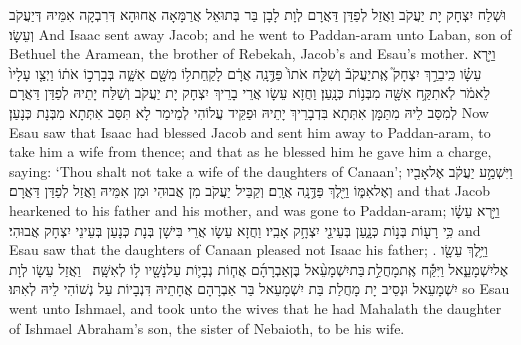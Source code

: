 {וּשְׁלַח יִצְחָק יָת יַעֲקֹב וַאֲזַל לְפַדַּן דַּאֲרָם לְוָת לָבָן בַּר בְּתוּאֵל אֲרַמָּאָה אֲחוּהָא דְּרִבְקָה אִמֵּיהּ דְּיַעֲקֹב וְעֵשָׂו׃}
{And Isaac sent away Jacob; and he went to Paddan-aram unto Laban, son of Bethuel the Aramean, the brother of Rebekah, Jacob’s and Esau’s mother.}{}
{וַיַּ֣רְא עֵשָׂ֗ו כִּֽי\maqqaf בֵרַ֣ךְ יִצְחָק֮ אֶֽת\maqqaf יַעֲקֹב֒ וְשִׁלַּ֤ח אֹתוֹ֙ פַּדֶּ֣נָֽה אֲרָ֔ם לָקַֽחַת\maqqaf ל֥וֹ מִשָּׁ֖ם אִשָּׁ֑ה בְּבָרְכ֣וֹ אֹת֔וֹ וַיְצַ֤ו עָלָיו֙ לֵאמֹ֔ר לֹֽא\maqqaf תִקַּ֥ח אִשָּׁ֖ה מִבְּנ֥וֹת כְּנָֽעַן׃}
{וַחֲזָא עֵשָׂו אֲרֵי בָרֵיךְ יִצְחָק יָת יַעֲקֹב וְשַׁלַּח יָתֵיהּ לְפַדַּן דַּאֲרָם לְמִסַּב לֵיהּ מִתַּמָּן אִתְּתָא בִּדְבָרֵיךְ יָתֵיהּ וּפַקֵּיד עֲלוֹהִי לְמֵימַר לָא תִּסַּב אִתְּתָא מִבְּנָת כְּנָעַן׃}
{Now Esau saw that Isaac had blessed Jacob and sent him away to Paddan-aram, to take him a wife from thence; and that as he blessed him he gave him a charge, saying: ‘Thou shalt not take a wife of the daughters of Canaan’;}{}
{וַיִּשְׁמַ֣ע יַעֲקֹ֔ב אֶל\maqqaf אָבִ֖יו וְאֶל\maqqaf אִמּ֑וֹ וַיֵּ֖לֶךְ פַּדֶּ֥נָֽה אֲרָֽם׃}
{וְקַבֵּיל יַעֲקֹב מִן אֲבוּהִי וּמִן אִמֵּיהּ וַאֲזַל לְפַדַּן דַּאֲרָם׃}
{and that Jacob hearkened to his father and his mother, and was gone to Paddan-aram;}{}
{וַיַּ֣רְא עֵשָׂ֔ו כִּ֥י רָע֖וֹת בְּנ֣וֹת כְּנָ֑עַן בְּעֵינֵ֖י יִצְחָ֥ק אָבִֽיו׃}
{וַחֲזָא עֵשָׂו אֲרֵי בִּישָׁן בְּנָת כְּנָעַן בְּעֵינֵי יִצְחָק אֲבוּהִי׃}
{and Esau saw that the daughters of Canaan pleased not Isaac his father; .}{}
{וַיֵּ֥לֶךְ עֵשָׂ֖ו אֶל\maqqaf יִשְׁמָעֵ֑אל וַיִּקַּ֡ח אֶֽת\maqqaf מָחֲלַ֣ת \legarmeh  בַּת\maqqaf יִשְׁמָעֵ֨אל בֶּן\maqqaf אַבְרָהָ֜ם אֲח֧וֹת נְבָי֛וֹת עַל\maqqaf נָשָׁ֖יו ל֥וֹ לְאִשָּֽׁה׃ \setuma }
{וַאֲזַל עֵשָׂו לְוָת יִשְׁמָעֵאל וּנְסֵיב יָת מָחֲלַת בַּת יִשְׁמָעֵאל בַּר אַבְרָהָם אֲחָתֵיהּ דִּנְבָיוֹת עַל נְשׁוֹהִי לֵיהּ לְאִתּוּ׃}
{so Esau went unto Ishmael, and took unto the wives that he had Mahalath the daughter of Ishmael Abraham’s son, the sister of Nebaioth, to be his wife.}{}
